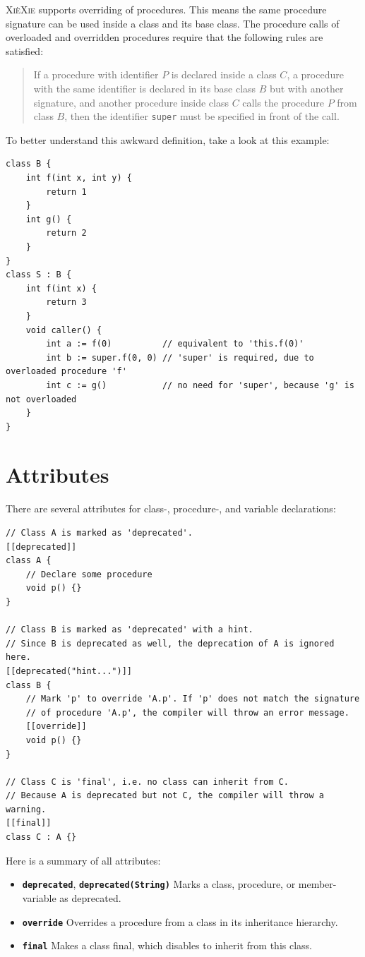 \documentclass{report}
\def\xiexie{\textsc{Xi\`eXie}\xspace}
\begin{document}
\xiexie supports overriding of procedures. This means the same procedure signature can be used inside a class and its
base class. The procedure calls of overloaded and overridden procedures require that the following rules are satisfied:
\begin{quote}
	If a procedure with identifier $P$ is declared inside a class $C$, a procedure with the same identifier is declared
	in its base class $B$ but with another signature, and another procedure inside class $C$ calls the procedure $P$
	from class $B$, then the identifier \texttt{super} must be specified in front of the call.
\end{quote}
To better understand this awkward definition, take a look at this example:
\begin{lstlisting}
class B {
    int f(int x, int y) {
        return 1
    }
    int g() {
        return 2
    }
}
class S : B {
    int f(int x) {
        return 3
    }
    void caller() {
        int a := f(0)          // equivalent to 'this.f(0)'
        int b := super.f(0, 0) // 'super' is required, due to overloaded procedure 'f'
        int c := g()           // no need for 'super', because 'g' is not overloaded
    }
}
\end{lstlisting}



\section{Attributes}

There are several attributes for class-, procedure-, and variable declarations:
\begin{lstlisting}
// Class A is marked as 'deprecated'.
[[deprecated]]
class A {
    // Declare some procedure
    void p() {}
}

// Class B is marked as 'deprecated' with a hint.
// Since B is deprecated as well, the deprecation of A is ignored here.
[[deprecated("hint...")]]
class B {
    // Mark 'p' to override 'A.p'. If 'p' does not match the signature
    // of procedure 'A.p', the compiler will throw an error message.
    [[override]]
    void p() {}
}

// Class C is 'final', i.e. no class can inherit from C.
// Because A is deprecated but not C, the compiler will throw a warning.
[[final]]
class C : A {}
\end{lstlisting}
Here is a summary of all attributes:
\begin{itemize}
	\item \textbf{\texttt{deprecated}}, \textbf{\texttt{deprecated(String)}}
		Marks a class, procedure, or member-variable as deprecated.
	\item \textbf{\texttt{override}} Overrides a procedure from a class in its inheritance hierarchy.
	\item \textbf{\texttt{final}} Makes a class final, which disables to inherit from this class.
\end{itemize}
\end{document}
